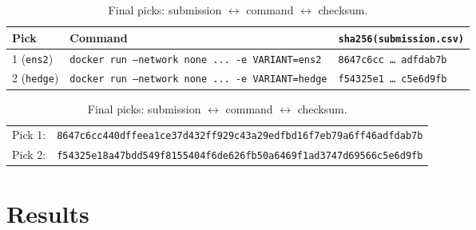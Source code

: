\documentclass[11pt,a4paper]{article}
\begin{document}
\begin{table}[h]
  \centering
  \caption{Final picks: submission $\leftrightarrow$ command $\leftrightarrow$ checksum.}
  \label{tab:picks}
  \small
  \begin{tabular}{lll}
    \toprule
    Pick & Command & \texttt{sha256(submission.csv)}\footnotemark \\
    \midrule
    1 (\texttt{ens2})  & \texttt{docker run --network none ... -e VARIANT=ens2}  & \texttt{8647c6cc\,\ldots\,adfdab7b} \\
    2 (\texttt{hedge}) & \texttt{docker run --network none ... -e VARIANT=hedge} & \texttt{f54325e1\,\ldots\,c5e6d9fb} \\
    \bottomrule
  \end{tabular}

  \vspace{0.5em}
  {\scriptsize
  \begin{tabular}{ll}
    Pick 1: & \texttt{8647c6cc440dffeea1ce37d432ff929c43a29edfbd16f7eb79a6ff46adfdab7b} \\
    Pick 2: & \texttt{f54325e18a47bdd549f8155404f6de626fb50a6469f1ad3747d69566c5e6d9fb} \\
  \end{tabular}}
\end{table}

\section{Results}
\label{sec:results}
\end{document}
